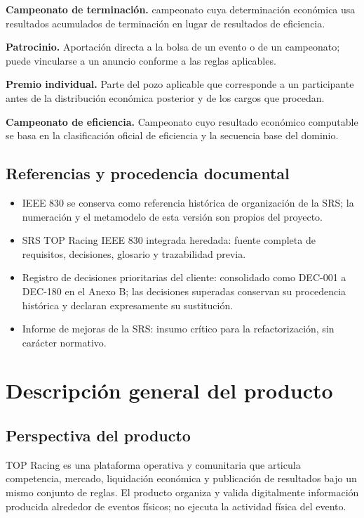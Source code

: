 \documentclass[10pt,letterpaper]{article}
\begin{document}
\noindent\textbf{Campeonato de terminación.} campeonato cuya determinación económica usa resultados acumulados de terminación en lugar de resultados de eficiencia.\par
\noindent\textbf{Patrocinio.} Aportación directa a la bolsa de un evento o de un campeonato; puede vincularse a un anuncio conforme a las reglas aplicables.\par
\noindent\textbf{Premio individual.} Parte del pozo aplicable que corresponde a un participante antes de la distribución económica posterior y de los cargos que procedan.\par
\noindent\textbf{Campeonato de eficiencia.} Campeonato cuyo resultado económico computable se basa en la clasificación oficial de eficiencia y la secuencia base del dominio.\par
\subsection{Referencias y procedencia documental}
\begin{itemize}
\item IEEE 830 se conserva como referencia histórica de organización de la SRS; la numeración y el metamodelo de esta versión son propios del proyecto.
\item SRS TOP Racing IEEE 830 integrada heredada: fuente completa de requisitos, decisiones, glosario y trazabilidad previa.
\item Registro de decisiones prioritarias del cliente: consolidado como DEC-001 a DEC-180 en el Anexo B; las decisiones superadas conservan su procedencia histórica y declaran expresamente su sustitución.
\item Informe de mejoras de la SRS: insumo crítico para la refactorización, sin carácter normativo.
\end{itemize}

\section{Descripción general del producto}
\subsection{Perspectiva del producto}
TOP Racing es una plataforma operativa y comunitaria que articula competencia, mercado, liquidación económica y publicación de resultados bajo un mismo conjunto de reglas. El producto organiza y valida digitalmente información producida alrededor de eventos físicos; no ejecuta la actividad física del evento.
\end{document}
